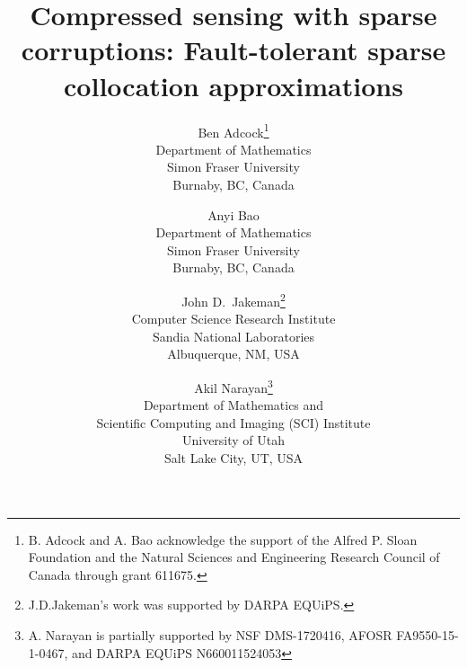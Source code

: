 \documentclass[10.5pt]{article}
\begin{document}
\title{Compressed sensing with sparse corruptions: Fault-tolerant sparse collocation approximations}
\author{
  Ben Adcock\footnote{B. Adcock and A. Bao acknowledge the support of the Alfred P. Sloan Foundation and the Natural Sciences and Engineering Research Council of Canada through grant 611675.} \\ Department of Mathematics \\ Simon Fraser University \\ Burnaby, BC, Canada 
  \and 
  Anyi Bao\footnotemark[1] \\ Department of Mathematics \\ Simon Fraser University \\ Burnaby, BC, Canada \\[20pt]
  \and 
  John D.\ Jakeman\footnote{J.D.Jakeman's work was supported by DARPA EQUiPS.} \\ Computer Science Research Institute \\ Sandia National Laboratories \\ Albuquerque, NM, USA\\[10pt]
  \and 
  Akil Narayan\footnote{A. Narayan is partially supported by NSF DMS-1720416, AFOSR FA9550-15-1-0467, and DARPA EQUiPS N660011524053} \\ Department of Mathematics and \\ Scientific Computing and Imaging (SCI) Institute \\ University of Utah \\ Salt Lake City, UT, USA
}
\end{document}

